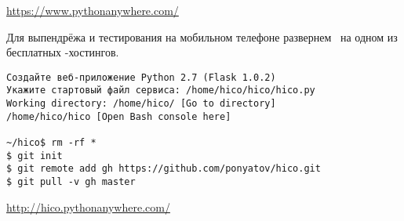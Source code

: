 
\url{https://www.pythonanywhere.com/}

\bigskip\noindent
Для выпендрёжа и тестирования на мобильном телефоне развернем \hico\ на одном из
бесплатных \py-хостингов.

\begin{verbatim}
Создайте веб-приложение Python 2.7 (Flask 1.0.2)
Укажите стартовый файл сервиса: /home/hico/hico/hico.py
Working directory: /home/hico/ [Go to directory]
/home/hico/hico [Open Bash console here]

~/hico$ rm -rf *
$ git init
$ git remote add gh https://github.com/ponyatov/hico.git
$ git pull -v gh master
\end{verbatim}

\url{http://hico.pythonanywhere.com/}
